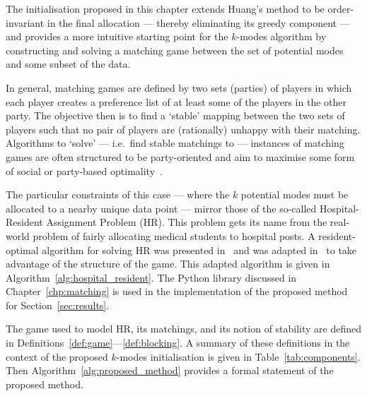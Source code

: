 The initialisation proposed in this chapter extends Huang's method to be
order-invariant in the final allocation --- thereby eliminating its greedy
component --- and provides a more intuitive starting point for the \(k\)-modes
algorithm by constructing and solving a matching game between the set of
potential modes and some subset of the data.

In general, matching games are defined by two sets (parties) of players in which
each player creates a preference list of at least some of the players in the
other party. The objective then is to find a `stable' mapping between the two
sets of players such that no pair of players are (rationally) unhappy with their
matching. Algorithms to `solve' --- i.e.\ find stable matchings to --- instances
of matching games are often structured to be party-oriented and aim to maximise
some form of social or party-based
optimality~\cite{%
    Erdil2017,Fuku2006,Gale1962,Iwama2016,Kwanashie2015,Manlove2002%
}.

The particular constraints of this case --- where the \(k\) potential modes must
be allocated to a nearby unique data point --- mirror those of the so-called
Hospital-Resident Assignment Problem (HR). This problem gets its name from the
real-world problem of fairly allocating medical students to hospital posts.  A
resident-optimal algorithm for solving HR was presented in~\cite{Gale1962} and
was adapted in~\cite{Roth1984} to take advantage of the structure of the game.
This adapted algorithm is given in Algorithm~\ref{alg:hospital_resident}. The
Python library discussed in Chapter~\ref{chp:matching} is used in the
implementation of the proposed method for Section~\ref{sec:results}.

The game used to model HR, its matchings, and its notion of stability are
defined in Definitions~\ref{def:game}---\ref{def:blocking}. A summary of these
definitions in the context of the proposed \(k\)-modes initialisation is given
in Table~\ref{tab:components}. Then Algorithm~\ref{alg:proposed_method} provides
a formal statement of the proposed method.

